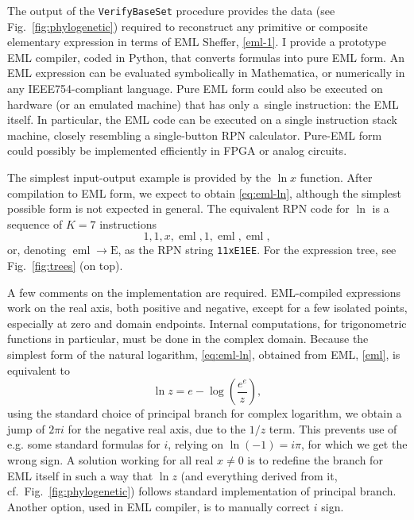 \documentclass[12pt]{article}
\DeclareMathOperator{\eml}{eml}
\begin{document}
The output of the \texttt{VerifyBaseSet} procedure provides the data (see Fig.~\ref{fig:phylogenetic}) required to reconstruct any primitive or composite elementary expression in terms of EML Sheffer, \eqref{eml-1}. 
I provide a prototype EML compiler, coded in Python, that converts formulas into pure EML form. An EML expression can be evaluated symbolically in Mathematica, or numerically in any IEEE754-compliant language. Pure EML form could also be executed on hardware (or an emulated machine) that has only a~single instruction: the EML itself. In particular, the EML code can be executed on a single instruction stack machine, closely resembling a single-button RPN calculator. Pure-EML form could possibly be implemented efficiently in FPGA or analog circuits.  


The simplest input-output example is provided by the $\ln x$ function. After compilation to EML form, we expect to obtain \eqref{eq:eml-ln}, although the simplest possible form is not expected in general. The equivalent RPN code for $\ln$ is a sequence of $K=7$ instructions
$$
{1, 1, x, \eml, 1, \eml, \eml},
$$
or, denoting $\eml \to \text{E}$, as the RPN string \texttt{11xE1EE}. For the expression tree, see Fig.~\ref{fig:trees} (on top).


A few comments on the implementation are required. EML-compiled expressions work on the real axis, both positive and negative, except for a few isolated points, especially at zero and domain endpoints. Internal computations, for trigonometric functions in particular, must be done in the complex domain. 
Because the simplest form of the natural logarithm, \eqref{eq:eml-ln},  obtained from EML, \eqref{eml}, is equivalent to
$$
\ln{z} = e- \log{\left( \frac{e^e}{z} \right )},
$$
using the standard choice of principal branch for complex logarithm, we obtain a jump of $2 \pi i$ for the negative real axis, due to the $1/z$ term. This prevents use of e.g. some standard formulas for $i$, relying on $\ln(-1) = i \pi$, for which we get the wrong sign. A solution working for all real $x \neq 0$ is to redefine the branch for EML itself in such a way that $\ln{z}$ (and everything derived from it, cf.~Fig.~\ref{fig:phylogenetic}) follows standard implementation of principal branch. Another
option, used in EML compiler, is to manually correct $i$ sign. 
\end{document}
